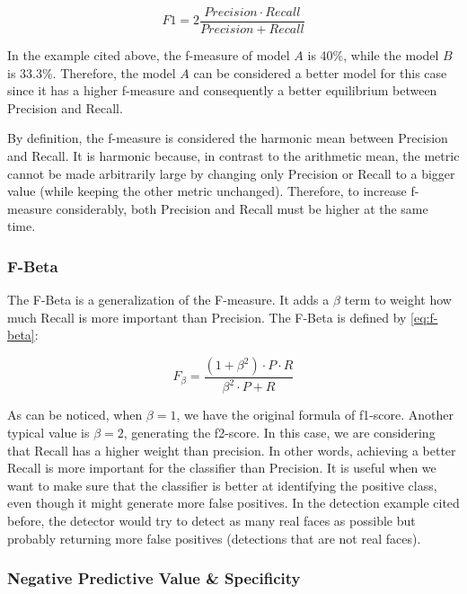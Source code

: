 \begin{equation}
\label{eq:f-measure}
F1 = 2\frac{Precision \cdot Recall}{Precision + Recall}
\end{equation}

In the example cited above, the f-measure of model $A$ is 40\%, while the model $B$ is 33.3\%. Therefore, the model $A$ can be considered a better model for this case since it has a higher f-measure and consequently a better equilibrium between Precision and Recall.

By definition, the f-measure is considered the harmonic mean between Precision and Recall. It is harmonic because, in contrast to the arithmetic mean, the metric cannot be made arbitrarily large by changing only Precision or Recall to a bigger value (while keeping the other metric unchanged). Therefore, to increase f-measure considerably, both Precision and Recall must be higher at the same time.

\subsubsection{F-Beta}

The F-Beta is a generalization of the F-measure. It adds a $\beta$ term to weight how much Recall is more important than Precision. The F-Beta is defined by \autoref{eq:f-beta}:

\begin{equation}
\label{eq:f-beta}
F_\beta = \frac{(1 + \beta^2) \cdot P \cdot R}{\beta^2 \cdot P + R}
\end{equation}

As can be noticed, when $\beta=1$, we have the original formula of f1-score. Another typical value is $\beta=2$, generating the f2-score. In this case, we are considering that Recall has a higher weight than precision. In other words, achieving a better Recall is more important for the classifier than Precision. It is useful when we want to make sure that the classifier is better at identifying the positive class, even though it might generate more false positives. In the detection example cited before, the detector would try to detect as many real faces as possible but probably returning more false positives (detections that are not real faces).

\subsubsection{Negative Predictive Value \& Specificity}


